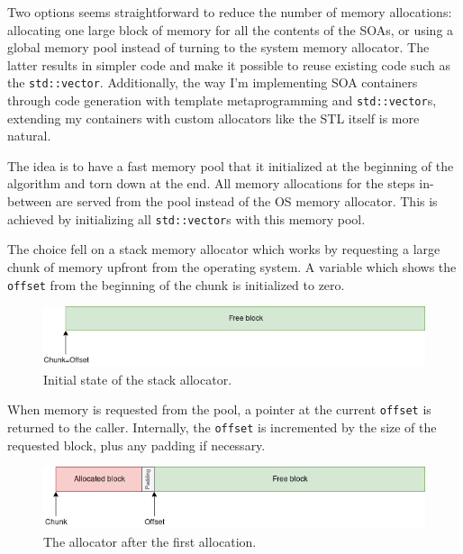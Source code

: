 \documentclass[12pt]{article}
\newcommand{\code}[1]{\texttt{#1}}
\begin{document}
\vspace{1pc}

Two options seems straightforward to reduce the number of memory allocations: allocating one large block of memory for all the contents of the SOAs, or using a global memory pool instead of turning to the system memory allocator. The latter results in simpler code and make it possible to reuse existing code such as the \code{std::vector}. Additionally, the way I'm implementing SOA containers through code generation with template metaprogramming and \code{std::vector}s, extending my containers with custom allocators like the STL itself is more natural.

\vspace{1pc}

The idea is to have a fast memory pool that it initialized at the beginning of the algorithm and torn down at the end. All memory allocations for the steps in-between are served from the pool instead of the OS memory allocator. This is achieved by initializing all \code{std::vector}s with this memory pool.


\vspace{1pc}

The choice fell on a stack memory allocator which works by requesting a large chunk of memory upfront from the operating system. A variable which shows the \code{offset} from the beginning of the chunk is initialized to zero.

\begin{figure}[H]
	\begin{center}
		\includegraphics[width=\textwidth]{velout_stack_allocator_initial}
	\end{center}
	\caption{Initial state of the stack allocator.}
	\label{fig_velout_stack_allocator_initial}
\end{figure}

When memory is requested from the pool, a pointer at the current \code{offset} is returned to the caller. Internally, the \code{offset} is incremented by the size of the requested block, plus any padding if necessary.

\begin{figure}[H]
	\begin{center}
		\includegraphics[width=\textwidth]{velout_stack_allocator_alloc1}
	\end{center}
	\caption{The allocator after the first allocation.}
	\label{fig_velout_stack_allocator_alloc1}
\end{figure}
\end{document}
